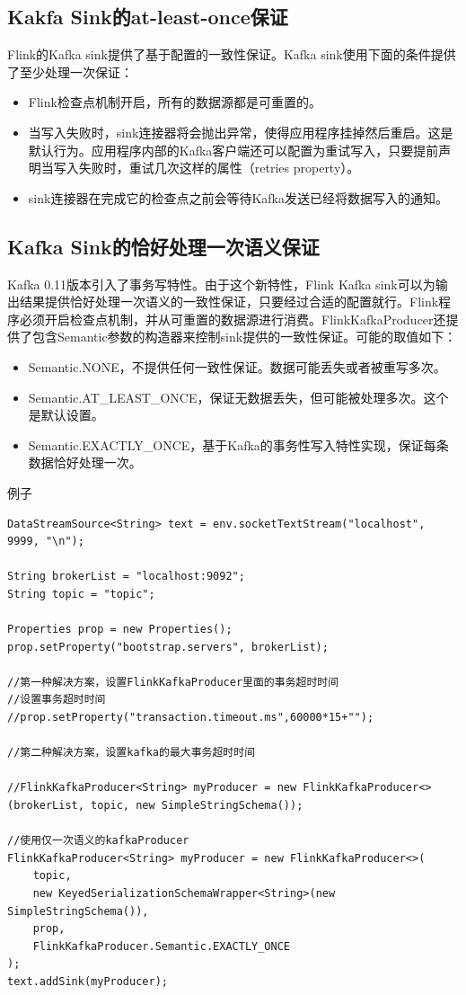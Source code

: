 \documentclass[cn,11pt,chinese]{elegantbook}
\begin{document}
\subsection{Kakfa Sink的at-least-once保证}

Flink的Kafka sink提供了基于配置的一致性保证。Kafka sink使用下面的条件提供了至少处理一次保证：

\begin{itemize}
    \item Flink检查点机制开启，所有的数据源都是可重置的。
    \item 当写入失败时，sink连接器将会抛出异常，使得应用程序挂掉然后重启。这是默认行为。应用程序内部的Kafka客户端还可以配置为重试写入，只要提前声明当写入失败时，重试几次这样的属性（retries property）。
    \item sink连接器在完成它的检查点之前会等待Kafka发送已经将数据写入的通知。
\end{itemize}

\subsection{Kafka Sink的恰好处理一次语义保证}

Kafka 0.11版本引入了事务写特性。由于这个新特性，Flink Kafka sink可以为输出结果提供恰好处理一次语义的一致性保证，只要经过合适的配置就行。Flink程序必须开启检查点机制，并从可重置的数据源进行消费。FlinkKafkaProducer还提供了包含Semantic参数的构造器来控制sink提供的一致性保证。可能的取值如下：

\begin{itemize}
    \item Semantic.NONE，不提供任何一致性保证。数据可能丢失或者被重写多次。
    \item Semantic.AT\_LEAST\_ONCE，保证无数据丢失，但可能被处理多次。这个是默认设置。
    \item Semantic.EXACTLY\_ONCE，基于Kafka的事务性写入特性实现，保证每条数据恰好处理一次。
\end{itemize}

例子

\begin{verbatim}
DataStreamSource<String> text = env.socketTextStream("localhost", 9999, "\n");

String brokerList = "localhost:9092";
String topic = "topic";

Properties prop = new Properties();
prop.setProperty("bootstrap.servers", brokerList);

//第一种解决方案，设置FlinkKafkaProducer里面的事务超时时间
//设置事务超时时间
//prop.setProperty("transaction.timeout.ms",60000*15+"");

//第二种解决方案，设置kafka的最大事务超时时间

//FlinkKafkaProducer<String> myProducer = new FlinkKafkaProducer<>(brokerList, topic, new SimpleStringSchema());

//使用仅一次语义的kafkaProducer
FlinkKafkaProducer<String> myProducer = new FlinkKafkaProducer<>(
    topic,
    new KeyedSerializationSchemaWrapper<String>(new SimpleStringSchema()),
    prop,
    FlinkKafkaProducer.Semantic.EXACTLY_ONCE
);
text.addSink(myProducer);
\end{verbatim}
\end{document}
